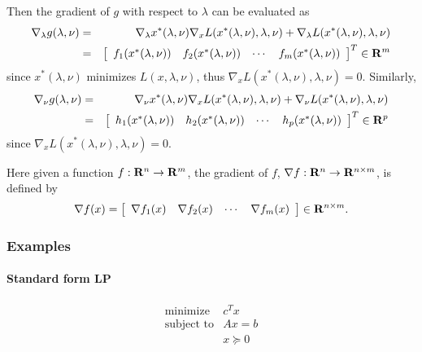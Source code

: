 Then the gradient of $g$ with respect to $\lambda$
can be evaluated as
\begin{eqnarray*}
\nabla_\lambda g(\lambda, \nu)
&=& \nabla_\lambda x^\ast(\lambda, \nu) \nabla_x L(x^\ast(\lambda, \nu), \lambda, \nu)
+ \nabla_\lambda L(x^\ast(\lambda, \nu), \lambda, \nu)
\\
&=& 
\left[\begin{array}{cccc} f_1(x^\ast(\lambda,\nu)) & f_2(x^\ast(\lambda,\nu)) & \cdots & f_m(x^\ast(\lambda, \nu)) \end{array}\right]^T
\in\mathbf{R}^m
\end{eqnarray*}
since $x^\ast(\lambda,\nu)$ minimizes $L(x,\lambda,\nu)$,
thus $\nabla_x L(x^\ast(\lambda, \nu), \lambda, \nu)=0$.
Similarly,
\begin{eqnarray*}
\nabla_\nu g(\lambda, \nu)
&=& \nabla_\nu x^\ast(\lambda, \nu) \nabla_x L(x^\ast(\lambda, \nu), \lambda, \nu)
+ \nabla_\nu L(x^\ast(\lambda, \nu), \lambda, \nu)
\\
&=& 
\left[\begin{array}{cccc} h_1(x^\ast(\lambda,\nu)) & h_2(x^\ast(\lambda,\nu)) & \cdots & h_p(x^\ast(\lambda, \nu)) \end{array}\right]^T
\in\mathbf{R}^p
\end{eqnarray*}
since $\nabla_x L(x^\ast(\lambda, \nu), \lambda, \nu)=0$.

Here given a function $f:\mathbf{R}^n\to\mathbf{R}^m$,
the gradient of $f$, $\nabla f:\mathbf{R}^n\to\mathbf{R}^{n\times m}$,
is defined by
\begin{equation}
\nabla f(x) = \left[\begin{array}{cccc}
\nabla f_1(x)
&
\nabla f_2(x)
&
\cdots
&
\nabla f_m(x)
\end{array}\right]
\in\mathbf{R}^{n\times m}.
\end{equation}


\subsubsection{Examples}

\paragraph{Standard form LP}

\begin{equation}
\begin{array}{ll}
\mbox{minimize} & c^T x
\\
\mbox{subject to} & Ax = b
\\
& x \succeq 0
\end{array}
\end{equation}

